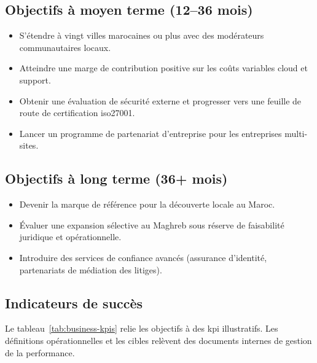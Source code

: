 \subsection{Objectifs à moyen terme (12--36 mois)}

\begin{itemize}
  \item S'étendre à vingt villes marocaines ou plus avec des modérateurs communautaires locaux.
  \item Atteindre une marge de contribution positive sur les coûts variables cloud et support.
  \item Obtenir une évaluation de sécurité externe et progresser vers une feuille de route de certification \gls{iso27001}.
  \item Lancer un programme de partenariat d'entreprise pour les entreprises multi-sites.
\end{itemize}

\subsection{Objectifs à long terme (36+ mois)}

\begin{itemize}
  \item Devenir la marque de référence pour la découverte locale au Maroc.
  \item Évaluer une expansion sélective au Maghreb sous réserve de faisabilité juridique et opérationnelle.
  \item Introduire des services de confiance avancés (assurance d'identité, partenariats de médiation des litiges).
\end{itemize}

\subsection{Indicateurs de succès}

Le tableau~\ref{tab:business-kpis} relie les objectifs à des \gls{kpi} illustratifs. Les définitions opérationnelles et les cibles relèvent des documents internes de gestion de la performance.

